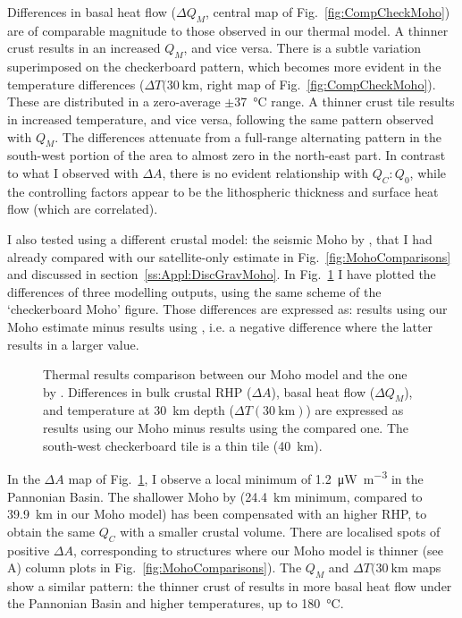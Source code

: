 Differences in basal heat flow ($\Delta Q_M$, central map of Fig.~\ref{fig:CompCheckMoho}) are of comparable magnitude to those observed in our thermal model.
A thinner crust results in an increased $Q_M$, and vice versa.
There is a subtle variation superimposed on the checkerboard pattern, which becomes more evident in the temperature differences ($\Delta T(30~\mathrm{km}$, right map of Fig.~\ref{fig:CompCheckMoho}).
These are distributed in a zero-average $\pm$\SI{37}{\celsius} range.
A thinner crust tile results in increased temperature, and vice versa, following the same pattern observed with $Q_M$.
The differences attenuate from a full-range alternating pattern in the south-west portion of the area to almost zero in the north-east part.
In contrast to what I observed with $\Delta A$, there is no evident relationship with $Q_C:Q_0$, while the controlling factors appear to be the lithospheric thickness and surface heat flow (which are correlated).

I also tested using a different crustal model: the seismic Moho by \textcite{Grad2009}, that I had already compared with our satellite-only estimate in Fig.~\ref{fig:MohoComparisons} and discussed in section~\ref{ss:Appl:DiscGravMoho}.
In Fig.~\ref{fig:CompGradMoho} I have plotted the differences of three modelling outputs, using the same scheme of the `checkerboard Moho' figure.
Those differences are expressed as: results using our Moho estimate minus results using \textcite{Grad2009}, i.e. a negative difference where the latter results in a larger value.

\begin{figure}
	\begin{adjustbox}{center}
	\end{adjustbox}
	\caption[Thermal results comparison between our Moho model and the one by \textcite{Grad2009}.]{Thermal results comparison between our Moho model and the one by \textcite{Grad2009}. Differences in bulk crustal RHP ($\Delta A$), basal heat flow ($\Delta Q_M$), and temperature at 30~\si{\kilo \metre} depth ($\Delta T(30~\mathrm{km})$) are expressed as results using our Moho minus results using the compared one. The south-west checkerboard tile is a thin tile (40~\si{\kilo \metre}).}
	\label{fig:CompGradMoho}
\end{figure}

In the $\Delta A$ map of Fig.~\ref{fig:CompGradMoho}, I observe a local minimum of \SI{1.2}{\micro \watt \per \cubic \metre} in the Pannonian Basin.
The shallower Moho by \textcite{Grad2009} (24.4~\si{\kilo \metre} minimum, compared to 39.9~\si{\kilo \metre} in our Moho model) has been compensated with an higher RHP, to obtain the same $Q_C$ with a smaller crustal volume.
There are localised spots of positive $\Delta A$, corresponding to structures where our Moho model is thinner (see A) column plots in Fig.~\ref{fig:MohoComparisons}).
The $Q_M$ and $\Delta T(30~\mathrm{km}$ maps show a similar pattern: the thinner crust of \textcite{Grad2009} results in more basal heat flow under the Pannonian Basin and higher temperatures, up to \SI[retain-explicit-plus]{+180}{\celsius}.

